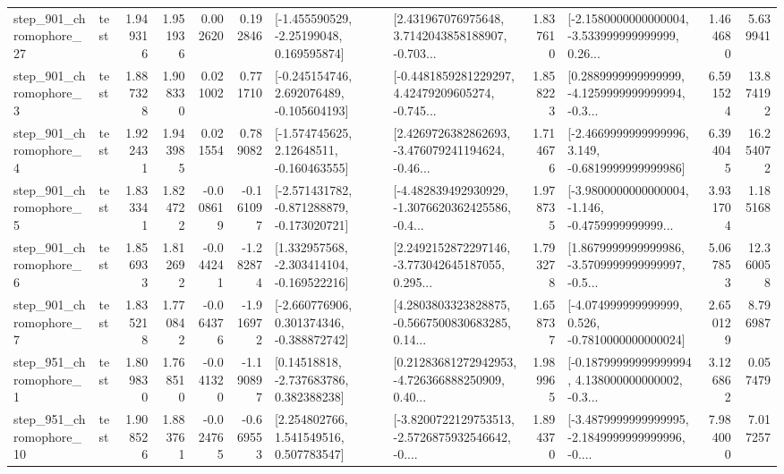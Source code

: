\begin{tabular}{llrrrrllrlrr}
  step\_901\_chromophore\_27 &      test &      1.949316 &    1.951936 &      0.002620 &  0.192846 &    [-1.455590529, -2.25199048, 0.169595874] &  [2.431967076975648, 3.7142043858188907, -0.703... &       1.837610 &  [-2.1580000000000004, -3.533999999999999, 0.26... &            1.464680 &          5.639941 \\
   step\_901\_chromophore\_3 &      test &      1.887328 &    1.908330 &      0.021002 &  0.771710 &   [-0.245154746, 2.692076489, -0.105604193] &  [-0.4481859281229297, 4.42479209605274, -0.745... &       1.858223 &  [0.2889999999999999, -4.1259999999999994, -0.3... &            6.591524 &         13.874192 \\
   step\_901\_chromophore\_4 &      test &      1.922431 &    1.943985 &      0.021554 &  0.789082 &    [-1.574745625, 2.12648511, -0.160463555] &  [2.4269726382862693, -3.476079241194624, -0.46... &       1.714676 &  [-2.4669999999999996, 3.149, -0.6819999999999986] &            6.394045 &         16.254072 \\
   step\_901\_chromophore\_5 &      test &      1.833341 &    1.824722 &     -0.008619 & -0.161097 &  [-2.571431782, -0.871288879, -0.173020721] &  [-4.482839492930929, -1.3076620362425586, -0.4... &       1.978735 &  [-3.9800000000000004, -1.146, -0.4759999999999... &            3.931704 &          1.185168 \\
   step\_901\_chromophore\_6 &      test &      1.856933 &    1.812692 &     -0.044241 & -1.282874 &   [1.332957568, -2.303414104, -0.169522216] &  [2.2492152872297146, -3.773042645187055, 0.295... &       1.793278 &  [1.8679999999999986, -3.5709999999999997, -0.5... &            5.067853 &         12.360058 \\
   step\_901\_chromophore\_7 &      test &      1.835218 &    1.770842 &     -0.064376 & -1.916972 &   [-2.660776906, 0.301374346, -0.388872742] &  [4.2803803323828875, -0.5667500830683285, 0.14... &       1.658737 &   [-4.074999999999999, 0.526, -0.7810000000000024] &            2.650129 &          8.796987 \\
   step\_951\_chromophore\_1 &      test &      1.809830 &    1.768510 &     -0.041320 & -1.190897 &     [0.14518818, -2.737683786, 0.382388238] &  [0.21283681272942953, -4.726366888250909, 0.40... &       1.989965 &  [-0.18799999999999994, 4.138000000000002, -0.3... &            3.126862 &          0.057479 \\
  step\_951\_chromophore\_10 &      test &      1.908526 &    1.883761 &     -0.024765 & -0.669553 &     [2.254802766, 1.541549516, 0.507783547] &  [-3.8200722129753513, -2.5726875932546642, -0.... &       1.894370 &  [-3.4879999999999995, -2.1849999999999996, -0.... &            7.984000 &          7.017257 \\

\end{tabular}
